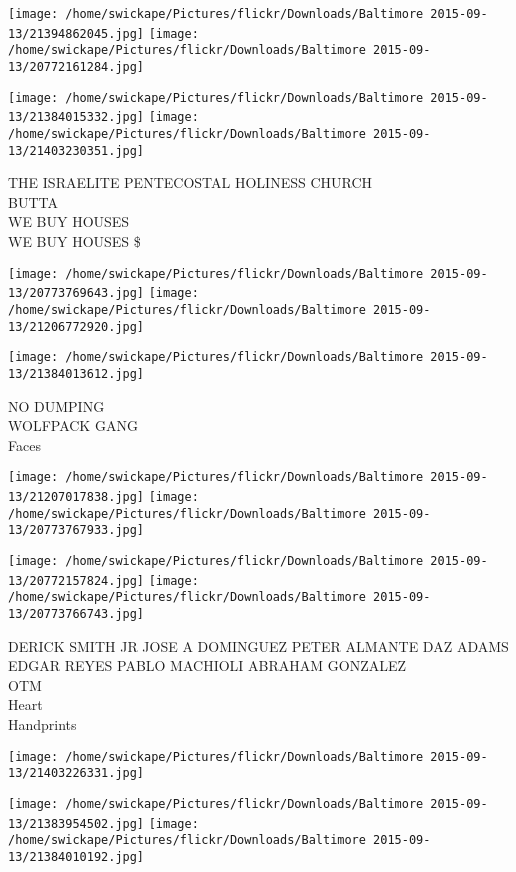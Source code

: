 \documentclass[10pt,letterpaper]{article}
\begin{document}
\texttt{[image: /home/swickape/Pictures/flickr/Downloads/Baltimore 2015-09-13/21394862045.jpg]}
\texttt{[image: /home/swickape/Pictures/flickr/Downloads/Baltimore 2015-09-13/20772161284.jpg]}

\texttt{[image: /home/swickape/Pictures/flickr/Downloads/Baltimore 2015-09-13/21384015332.jpg]}
\texttt{[image: /home/swickape/Pictures/flickr/Downloads/Baltimore 2015-09-13/21403230351.jpg]}

THE ISRAELITE PENTECOSTAL HOLINESS CHURCH\\
BUTTA\\
WE BUY HOUSES\\
WE BUY HOUSES \$
\pagebreak

\texttt{[image: /home/swickape/Pictures/flickr/Downloads/Baltimore 2015-09-13/20773769643.jpg]}
\texttt{[image: /home/swickape/Pictures/flickr/Downloads/Baltimore 2015-09-13/21206772920.jpg]}

\vspace{0.25in}
\texttt{[image: /home/swickape/Pictures/flickr/Downloads/Baltimore 2015-09-13/21384013612.jpg]}

NO DUMPING\\
WOLFPACK GANG\\
Faces
\pagebreak

\texttt{[image: /home/swickape/Pictures/flickr/Downloads/Baltimore 2015-09-13/21207017838.jpg]}
\texttt{[image: /home/swickape/Pictures/flickr/Downloads/Baltimore 2015-09-13/20773767933.jpg]}

\texttt{[image: /home/swickape/Pictures/flickr/Downloads/Baltimore 2015-09-13/20772157824.jpg]}
\texttt{[image: /home/swickape/Pictures/flickr/Downloads/Baltimore 2015-09-13/20773766743.jpg]}

DERICK SMITH JR JOSE A DOMINGUEZ PETER ALMANTE DAZ ADAMS EDGAR REYES PABLO MACHIOLI ABRAHAM GONZALEZ\\
OTM\\
Heart\\
Handprints
\pagebreak

\texttt{[image: /home/swickape/Pictures/flickr/Downloads/Baltimore 2015-09-13/21403226331.jpg]}

\vspace{0.25in}
\texttt{[image: /home/swickape/Pictures/flickr/Downloads/Baltimore 2015-09-13/21383954502.jpg]}
\texttt{[image: /home/swickape/Pictures/flickr/Downloads/Baltimore 2015-09-13/21384010192.jpg]}
\end{document}

